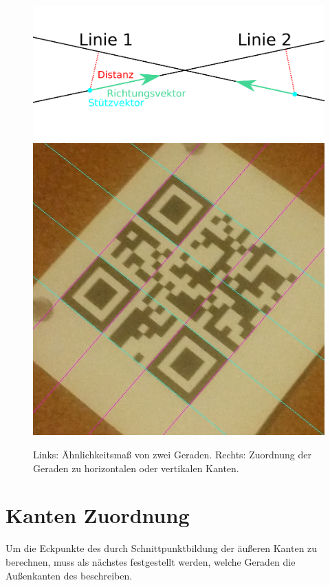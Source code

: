 \begin{figure}[h]
\center
\includegraphics[scale=1]{images/similarity_measure.png}
\hspace{5px}
\includegraphics[scale=0.25]{images/qrcode-adler-wand_6___SPLIT___0_.jpg}
\caption{Links: Ähnlichkeitsmaß von zwei Geraden. Rechts: Zuordnung der Geraden zu horizontalen oder vertikalen Kanten.}
\end{figure}

\section{Kanten Zuordnung}
Um die Eckpunkte des \QRCodes durch Schnittpunktbildung der äußeren Kanten zu berechnen, muss als nächstes festgestellt werden, welche Geraden die Außenkanten des \QRCodes beschreiben.

